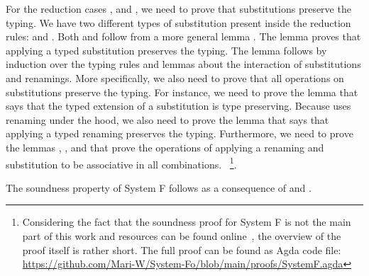\noindent For the  reduction cases ,  and , we need to prove that substitutions preserve the typing. 
We have two different types of substitution present inside the reduction rules:  \Data{[}  \Data{]} and  \Data{[}  \Data{]}.
Both  and  follow from a more general lemma . 
The lemma  proves that applying a typed substitution preserves the typing.
\Fpreserves
The lemma  follows by induction over the typing rules and lemmas about the interaction of substitutions and renamings. 
More specifically, we also need to prove that all operations on substitutions preserve the typing. 
For instance, we need to prove the lemma  that says that the typed extension of a substitution  is type preserving. 
Because  uses renaming under the hood, we also need to prove the lemma  that says that applying a typed renaming preserves the typing. 
Furthermore, we need to prove the lemmas , ,  and  that prove the operations of applying a renaming and substitution to be associative in all combinations.
~\footnote{Considering the fact that the soundness proof for System F is not the main part of this work and resources can be found online~\cite{fp}, the overview of the proof itself is rather short.
The full proof can be found as Agda code file: \url{https://github.com/Mari-W/System-Fo/blob/main/proofs/SystemF.agda}}.

\noindent The soundness property of System F follows as a consequence of  and . 